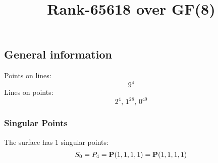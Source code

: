 \documentclass{article}
\newcommand\setTBstruts{\def\T{\rule{0pt}{2.6ex}}%
\def\B{\rule[-1.2ex]{0pt}{0pt}}}
\newcommand{\bP}{{\bf P}}
\begin{document}
 
\setTBstruts



{\allowdisplaybreaks%






\title{Rank-65618 over GF(8)}
\author{}%
\maketitle%
%
{}



\subsection*{General information}
Points on lines:
$$
9^4$$
Lines on points:
$$
2^4,\,1^{28},\,0^{49}$$
\subsubsection*{Singular Points}
The surface has 1 singular points:\\
\begin{align*}
S_{0} &= P_{4}=\bP(1, 1, 1, 1) = \bP(1, 1, 1, 1)\\
\end{align*}
}
\end{document}
